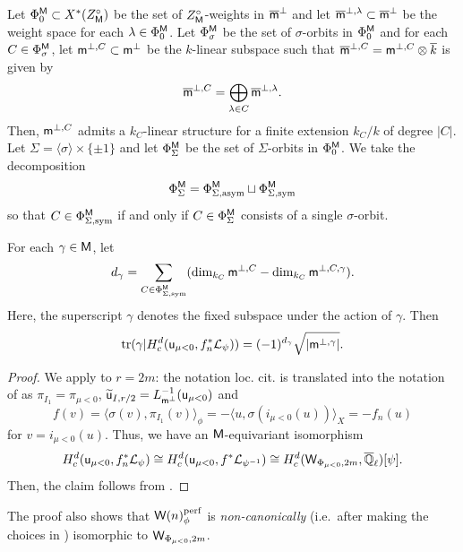 \documentclass[12pt,reqno]{amsart}
\begin{document}
\begin{defi}
    Let $\Phi_0^{{\mathsf{M}}} \subset X^*(Z_{{\mathsf{M}}}^\circ)$ be the set of $Z_{{\mathsf{M}}}^\circ$-weights in ${\mathsf{{\overline{m}}}}^\perp$ and let ${\mathsf{{\overline{m}}}}^{\perp, \lambda} \subset {\mathsf{{\overline{m}}}}^\perp$ be the weight space for each $\lambda \in \Phi_0^{{\mathsf{M}}}$. Let $\Phi_{\sigma}^{{\mathsf{M}}}$ be the set of $\sigma$-orbits in $\Phi_0^{{\mathsf{M}}}$ and for each $C \in \Phi_{\sigma}^{{\mathsf{M}}}$, let ${\mathsf{m}}^{\perp, C} \subset {\mathsf{m}}^\perp$ be the $k$-linear subspace such that ${\overline{{\mathsf{m}}}}^{\perp, C} = {\mathsf{m}}^{\perp, C} \otimes {\overline{k}}$ is given by
    \[
        {\overline{{\mathsf{m}}}}^{\perp, C} = \bigoplus_{\lambda \in C} {\mathsf{{\overline{m}}}}^{\perp, \lambda}. 
    \]
    Then, ${\mathsf{m}}^{\perp, C}$ admits a $k_C$-linear structure for a finite extension $k_C / k$ of degree $\lvert C \rvert$. Let $\Sigma = \langle \sigma \rangle \times \{ \pm 1 \}$ and let $\Phi_{\Sigma}^{{\mathsf{M}}}$ be the set of $\Sigma$-orbits in $\Phi_0^{{\mathsf{M}}}$. We take the decomposition 
    \[
        \Phi_\Sigma^{{\mathsf{M}}} = \Phi_{\Sigma, {\operatorname{asym}}}^{{\mathsf{M}}} \sqcup \Phi_{\Sigma, {\operatorname{sym}}}^{{\mathsf{M}}}
    \]
    so that $C \in \Phi_{\Sigma, {\operatorname{sym}}}^{{\mathsf{M}}}$ if and only if $C \in \Phi_\Sigma^{{\mathsf{M}}}$ consists of a single $\sigma$-orbit. 
\end{defi}

\begin{prop} \label{prop:trace_computation_cohomology}
    For each $\gamma \in {\mathsf{M}}$, let 
    \[
        d_\gamma = \sum_{C \in \Phi_{\Sigma, {\operatorname{sym}}}^{{\mathsf{M}}}} (\dim_{k_C} {\mathsf{m}}^{\perp, C} - \dim_{k_C} {\mathsf{m}}^{\perp, C, \gamma}). 
    \]
    Here, the superscript $\gamma$ denotes the fixed subspace under the action of $\gamma$. Then 
    \[
        {\operatorname{tr}}(\gamma \vert H_c^d({\mathsf{u}}_{\mu < 0}, f_n^*{\mathcal{L}}_{\psi})) = (-1)^{d_\gamma} \sqrt{\lvert {\mathsf{m}}^{\perp, \gamma} \rvert}. 
    \]
\end{prop}
\begin{proof}
    We apply \cite[Proposition 5.3]{Tak26_Yu} to $r = 2m$: the notation loc. cit. is translated into the notation of  as $\pi_{I_1} = \pi_{\mu < 0}$, ${\widetilde{{\mathsf{u}}}}_{I, r/2} = L_{{\mathsf{m}}^\perp}^{-1}({\mathsf{u}}_{\mu < 0})$ and 
    \[
        f(v) = \langle \sigma(v), \pi_{I_1}(v) \rangle_\phi = - \langle u, \sigma(i_{\mu < 0}(u)) \rangle_X = - f_n(u)
    \]
    for $v = i_{\mu < 0}(u)$. Thus, we have an ${\mathsf{M}}$-equivariant isomorphism 
    \[
        H_c^d({\mathsf{u}}_{\mu < 0}, f_n^*{\mathcal{L}}_{\psi}) \cong H_c^d({\mathsf{u}}_{\mu < 0}, f^*{\mathcal{L}}_{\psi^{-1}}) \cong H_c^d({\mathsf{W}}_{\Phi_{\mu < 0}, 2m}, {\overline{\mathbb{Q}}_\ell})[\psi]. 
    \]
    Then, the claim follows from \cite[Theorem 2.27, Theorem 5.14]{Tak26_Yu}. 
\end{proof}
\begin{rmk} \label{rmk:comparison_Heisenberg_Deligne_Lusztig}
    The proof also shows that ${\mathsf{W}}(n)_\phi^{\operatorname{perf}}$ is \textit{non-canonically} (i.e.\ after making the choices in ) isomorphic to ${\mathsf{W}}_{\Phi_{\mu < 0}, 2m}$. %
\end{rmk}
\end{document}
